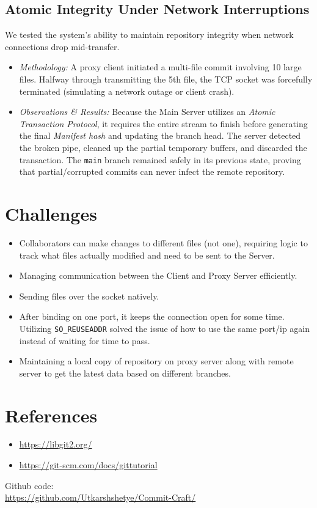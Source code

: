 \documentclass[12pt,a4paper]{article}
\begin{document}
\subsection{Atomic Integrity Under Network Interruptions}
We tested the system's ability to maintain repository integrity when network connections drop mid-transfer.
\begin{itemize}
    \item \textit{Methodology:} A proxy client initiated a multi-file commit involving 10 large files. Halfway through transmitting the 5th file, the TCP socket was forcefully terminated (simulating a network outage or client crash).
    \item \textit{Observations \& Results:} Because the Main Server utilizes an \textit{Atomic Transaction Protocol}, it requires the entire stream to finish before generating the final \textit{Manifest hash} and updating the branch head. The server detected the broken pipe, cleaned up the partial temporary buffers, and discarded the transaction. The \texttt{main} branch remained safely in its previous state, proving that partial/corrupted commits can never infect the remote repository.
\end{itemize}

\section{Challenges}
\begin{itemize}
    \item Collaborators can make changes to different files (not one), requiring logic to track what files actually modified and need to be sent to the Server.
    \item Managing communication between the Client and Proxy Server efficiently.
    \item Sending files over the socket natively.
    \item After binding on one port, it keeps the connection open for some time. Utilizing \texttt{SO\_REUSEADDR} solved the issue of how to use the same port/ip again instead of waiting for time to pass.
    \item Maintaining a local copy of repository on proxy server along with remote server to get the latest data based on different branches.
\end{itemize}

\section{References}
\begin{itemize}
    \item \url{https://libgit2.org/}
    \item \url{https://git-scm.com/docs/gittutorial}
\end{itemize}

Github code:\\
\url{https://github.com/Utkarshshetye/Commit-Craft/}
\end{document}
